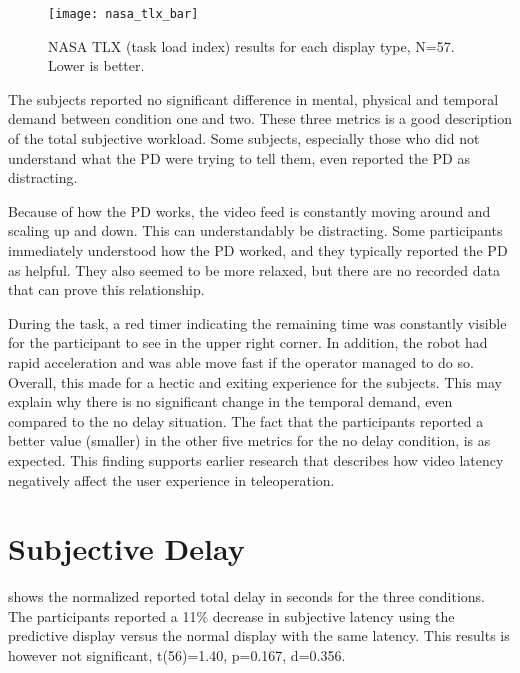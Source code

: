 \begin{figure}[h!]
    \centering
    \texttt{[image: nasa\_tlx\_bar]}
    \vspace{-2mm}
    \caption{NASA TLX (task load index) results for each display type, N=57. Lower is better.}
    \vspace{-3mm}
    \label{tlx}
\end{figure}

The subjects reported no significant difference in mental, physical and temporal demand between condition one and two. These three metrics is a good description of the total subjective workload. Some subjects, especially those who did not understand what the PD were trying to tell them, even reported the PD as distracting.

\restoregeometry

Because of how the PD works, the video feed is constantly moving around and scaling up and down. This can understandably be distracting. Some participants immediately understood how the PD worked, and they typically reported the PD as helpful. They also seemed to be more relaxed, but there are no recorded data that can prove this relationship.



During the task, a red timer indicating the remaining time was constantly visible for the participant to see in the upper right corner. In addition, the robot had rapid acceleration and was able move fast if the operator managed to do so. Overall, this made for a hectic and exiting experience for the subjects. This may explain why there is no significant change in the temporal demand, even compared to the no delay situation. The fact that the participants reported a better value (smaller) in the other five metrics for the no delay condition, is as expected. This finding supports earlier research that describes how video latency negatively affect the user experience in teleoperation.

\clearpage
\section{Subjective Delay}

 shows the normalized reported total delay in seconds for the three conditions. The participants reported a 11\% decrease in subjective latency using the predictive display versus the normal display with the same latency. This results is however not significant, t(56)=1.40, p=0.167, d=0.356.

